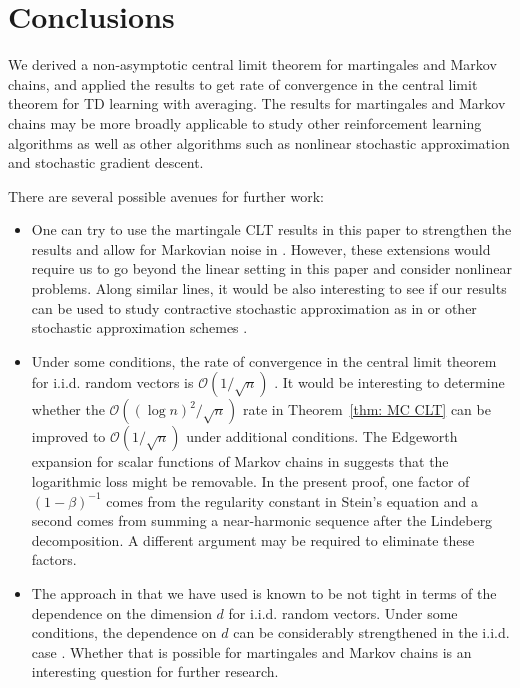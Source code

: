 \documentclass[11pt]{article}
\begin{document}
\section{Conclusions}\label{sec: conclusions}

We derived a non-asymptotic central limit theorem for martingales and Markov chains, and applied the results to get rate of convergence in the central limit theorem for TD learning with averaging. The results for martingales and Markov chains may be more broadly applicable to study other reinforcement learning algorithms as well as other algorithms such as nonlinear stochastic approximation and stochastic gradient descent.

There are several possible avenues for further work:
\begin{itemize}
    \item One can try to use the martingale CLT results in this paper to strengthen the results and allow for Markovian noise in \citep{anastasiou2019normal}. However, these extensions would require us to go beyond the linear setting in this paper and consider nonlinear problems. Along similar lines, it would be also interesting to see if our results can be used to study contractive stochastic approximation as in \citep{chen2023lyapunov} or other stochastic approximation schemes \citep{borkar2009stochastic,kushnerg}.
    \item Under some conditions, the rate of convergence in the central limit theorem for i.i.d. random vectors is $\mathcal{O}(1/\sqrt{n})$ \citep{fang2019multivariate}. It would be interesting to determine whether the $\mathcal{O}((\log n)^2/\sqrt{n})$ rate in Theorem~\ref{thm: MC CLT} can be improved to $\mathcal{O}(1/\sqrt{n})$ under additional conditions. The Edgeworth expansion for scalar functions of Markov chains in \citep{kontoyiannis2003spectral} suggests that the logarithmic loss might be removable. In the present proof, one factor of $(1-\beta)^{-1}$ comes from the regularity constant in Stein's equation and a second comes from summing a near-harmonic sequence after the Lindeberg decomposition. A different argument may be required to eliminate these factors.
    \item The approach in \citep{gallouet2018regularity} that we have used is known to be not tight in terms of the dependence on the dimension $d$ for i.i.d. random vectors. Under some conditions, the dependence on $d$ can be considerably strengthened in the i.i.d. case \citep{courtade2019existence,zhai2018high}. Whether that is possible for martingales and Markov chains is an interesting question for further research.

\end{itemize}
\end{document}
